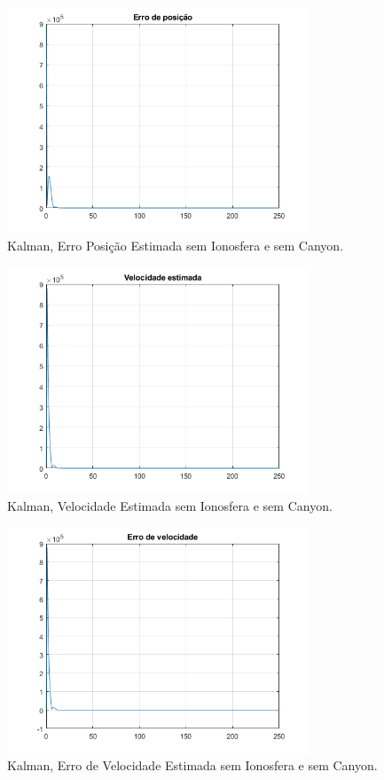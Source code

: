 \documentclass[palatino]{ist-report}
\begin{document}
\begin{figure}[ht]
	\centering
	\includegraphics[width=0.8\textwidth]{kalman_4/2-4-erro_posicao.png}
	\caption{Kalman, Erro Posição Estimada sem Ionosfera e sem Canyon.}
	\label{ePosicao24}
\end{figure}

\begin{figure}[ht]
	\centering
	\includegraphics[width=0.8\textwidth]{kalman_4/2-4-velocidade_estimada.png}
	\caption{Kalman, Velocidade Estimada sem Ionosfera e sem Canyon.}
	\label{velocidade24}
\end{figure}


\begin{figure}[ht]
	\centering
	\includegraphics[width=0.8\textwidth]{kalman_4/2-4-erro_velocidade.png}
	\caption{Kalman, Erro de Velocidade Estimada sem Ionosfera e sem Canyon.}
	\label{evelocidade24}
\end{figure}
\end{document}
